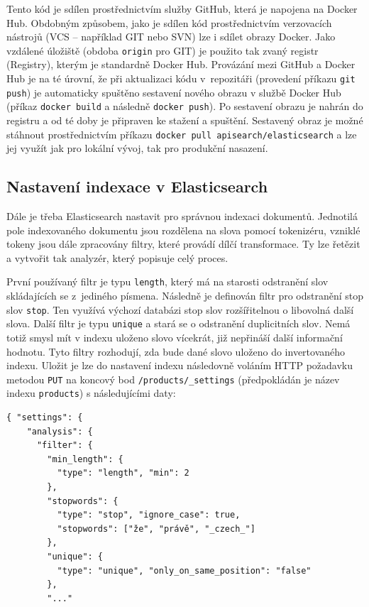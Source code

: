 \documentclass[FM,DP]{tulthesis}
\newenvironment{code}
    {\filbreak\captionsetup{type=listing}}{\filbreak}
\begin{document}
Tento kód je sdílen prostřednictvím služby GitHub, která je napojena na Docker Hub. 
Obdobným způsobem, jako je sdílen kód prostřednictvím verzovacích nástrojů (VCS --
například GIT nebo SVN) lze i sdílet obrazy Docker. Jako vzdálené úložiště (obdoba 
\verb|origin| pro GIT) je použito tak zvaný registr (Registry), kterým je standardně
Docker Hub. Provázání mezi GitHub a Docker Hub je na té úrovní, že při aktualizaci 
kódu v~repozitáři (provedení příkazu \verb|git push|) je automaticky spuštěno sestavení 
nového obrazu v službě Docker Hub (příkaz \verb|docker build| a následně \verb|docker push|).
Po sestavení obrazu je nahrán do registru a od té doby je připraven ke stažení a spuštění.
Sestavený obraz je možné stáhnout prostřednictvím příkazu \verb|docker pull apisearch/elasticsearch|
a lze jej využít jak pro lokální vývoj, tak pro produkční nasazení.

\subsection{Nastavení indexace v Elasticsearch}

Dále je třeba Elasticsearch nastavit pro správnou indexaci dokumentů. Jednotilá pole indexovaného
dokumentu jsou rozdělena na slova pomocí tokenizéru, vzniklé tokeny jsou dále zpracovány filtry, 
které provádí dílčí transformace. Ty lze řetězit a vytvořit tak analyzér, který popisuje
celý proces.


První používaný filtr je typu \verb|length|, který má na starosti odstranění slov skládajících
se z~jediného písmena. Následně je definován filtr pro odstranění stop slov \verb|stop|.
Ten využívá výchozí databázi stop slov rozšířitelnou o libovolná další slova. Další filtr
je typu \verb|unique| a stará se o odstranění duplicitních slov. Nemá totiž smysl mít v indexu
uloženo slovo vícekrát, již nepřináší další informační hodnotu. Tyto filtry rozhodují, 
zda bude dané slovo uloženo do invertovaného indexu. Uložit je lze do nastavení indexu
následovně voláním HTTP požadavku metodou \verb|PUT| na koncový bod \verb|/products/_settings| 
(předpokládán je název indexu \verb|products|) s následujícími daty:

\begin{code}
\captionsetup{singlelinecheck=false,justification=raggedright}
\label{code:es-filters-1}
\begin{verbatim}
{ "settings": {
    "analysis": {
      "filter": {
        "min_length": {
          "type": "length", "min": 2
        },
        "stopwords": {
          "type": "stop", "ignore_case": true, 
          "stopwords": ["že", "právě", "_czech_"]
        },
        "unique": {
          "type": "unique", "only_on_same_position": "false"
        },
        "..."
\end{verbatim}
\end{code}
\end{document}
